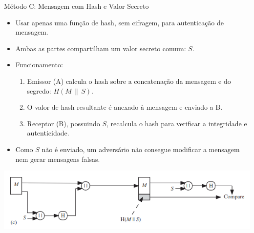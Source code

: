 \begin{frame}{Método C: Mensagem com Hash e Valor Secreto}
    \begin{itemize}
        \item Usar apenas uma função de hash, sem cifragem, para autenticação de mensagem.
        \item Ambas as partes compartilham um valor secreto comum: $S$.
        \item Funcionamento:
        \begin{enumerate}
            \item Emissor (A) calcula o hash sobre a concatenação da mensagem e do segredo: $H(M \,\|\, S)$.
        \item O valor de hash resultante é anexado à mensagem e enviado a B.
        \item Receptor (B), possuindo $S$, recalcula o hash para verificar a integridade e autenticidade. 
        \end{enumerate}
        
        \item Como $S$ não é enviado, um adversário não consegue modificar a mensagem nem gerar mensagens falsas.
    \end{itemize}

    \centering
\includegraphics[width=0.7\linewidth]{Figuras/esquema3-hash.png}
\end{frame}





